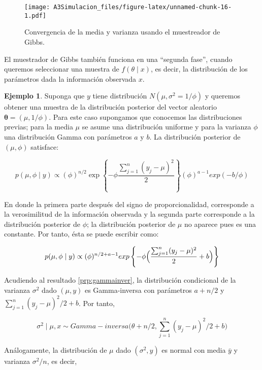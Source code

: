 \documentclass[
  spanish,
]{book}
\theoremstyle{definition}
\theoremstyle{definition}
\newtheorem{example}{Ejemplo}[chapter]
\theoremstyle{definition}
\theoremstyle{definition}
\theoremstyle{remark}
\begin{document}
\begin{figure}
\centering
\texttt{[image: A3Simulacion\_files/figure-latex/unnamed-chunk-16-1.pdf]}
\caption{\label{fig:unnamed-chunk-16}Convergencia de la media y varianza usando el muestreador de Gibbs.}
\end{figure}

El muestrador de Gibbs también funciona en una ``segunda fase'', cuando queremos seleccionar una muestra de \(f(\theta\mid x)\), es decir, la distribución de los parámetros dada la información observada \(x\).

\begin{example}
\protect\hypertarget{exm:GibbsN2}{}{\label{exm:GibbsN2} }Suponga que \(y\) tiene distribución \(N(\mu,\sigma^2=1/\phi)\) y queremos obtener una muestra de la distribución posterior del vector aleatorio \(\boldsymbol \theta=(\mu,1/\phi)\). Para este caso supongamos que conocemos las distribuciones previas; para la media \(\mu\) se asume una distribución uniforme y para la varianza \(\phi\) una distribución Gamma con parámetros \(a\) y \(b\). La distribución posterior de \((\mu, \phi)\) satisface:

\begin{equation}  
p(\mu, \phi \mid y) \propto (\phi)^{n/2}
\exp\left\{-\phi
\frac{\sum_{j=1}^n(y_j-\mu)^2}{2}\right\}(\phi)^{a-1}exp(-b/\phi)
\end{equation}

En donde la primera parte después del signo de proporcionalidad, corresponde a la verosimilitud de la información observada y la segunda parte corresponde a la distribución posterior de \(\phi\); la distribución posterior de \(\mu\) no
aparece pues es una constante. Por tanto, ésta se puede escribir como:

\begin{equation*}  
p(\mu, \phi \mid y)\propto(\phi)^{n/2+a-1}exp\left\{-\phi\Bigl(\frac{\sum_{j=1}^n(y_j-\mu)^2}{2}+b\Bigl)\right\}
\end{equation*}

Acudiendo al resultado \ref{prp:gammainver}, la distribución condicional de la varianza \(\sigma^2\) dado \((\mu, y)\) es Gamma-inversa con parámetros \(a+n/2\) y \(\sum_{j=1}^n(y_j-\mu)^2/2+b\). Por tanto,

\begin{equation} 
\label{eq:apmunormal}
\sigma^2\mid\mu,x\sim Gamma-inversa\biggl(\theta+n/2,\sum_{j=1}^n(y_j-\mu)^2/2+b\biggl)
\end{equation}

Análogamente, la distribución de \(\mu\) dado \((\sigma^2, y)\) es normal
con media \(\bar{y}\) y varianza \(\sigma^2/n\), es decir,


\end{example}
\end{document}
